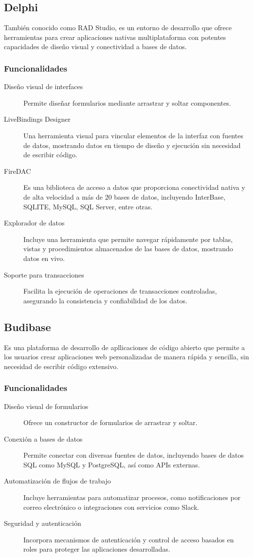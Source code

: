 \documentclass[12pt, a4paper]{article}
\begin{document}
\subsection{Delphi}
También conocido como RAD Studio, es un entorno de desarrollo que ofrece herramientas para crear aplicaciones nativas multiplataforma con potentes capacidades de diseño visual y conectividad a bases de datos.

\subsubsection{Funcionalidades}
\begin{description}
 \item[Diseño visual de interfaces] Permite diseñar formularios mediante arrastrar y soltar componentes.
 \item[LiveBindings Designer] Una herramienta visual para vincular elementos de la interfaz con fuentes de datos, mostrando datos en tiempo de diseño y ejecución sin necesidad de escribir código.
 \item[FireDAC] Es una biblioteca de acceso a datos que proporciona conectividad nativa y de alta velocidad a más de 20 bases de datos, incluyendo InterBase, SQLITE, MySQL, SQL Server, entre otras.
 \item[Explorador de datos] Incluye una herramienta que permite navegar rápidamente por tablas, vistas y procedimientos almacenados de las bases de datos, mostrando datos en vivo.
 \item[Soporte para transacciones] Facilita la ejecución de operaciones de transacciones controladas, asegurando la consistencia y confiabilidad de los datos.
\end{description}

\subsection{Budibase}
Es una plataforma de desarrollo de apllicaciones de código abierto que permite a los usuarios crear aplicaciones web personalizadas de manera rápida y sencilla, sin necesidad de escribir código extensivo.
\subsubsection{Funcionalidades}
\begin{description}
 \item[Diseño visual de formularios] Ofrece un constructor de formularios de arrastrar y soltar.
 \item[Conexión a bases de datos] Permite conectar con diversas fuentes de datos, incluyendo bases de datos SQL como MySQL y PostgreSQL, así como APIs externas.
 \item [Automatización de flujos de trabajo] Incluye herramientas para automatizar procesos, como notificaciones por correo electrónico o integraciones con servicios como Slack.
 \item [Seguridad y autenticación] Incorpora mecanismos de autenticación y control de acceso basados en roles para proteger las aplicaciones desarrolladas.
\end{description}
\end{document}
